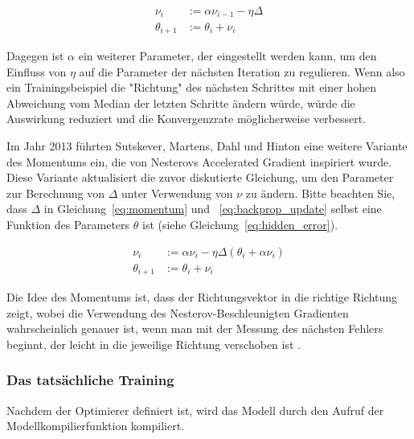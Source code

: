 \begin{equation}
    \begin{split}
        \nu_{i} &:= \alpha \nu_{i-1} - \eta \varDelta \\
        \theta_{i+1} &:= \theta_i + \nu_i
    \end{split}
    \label{eq:momentum}
\end{equation}

Dagegen ist $\alpha$ ein weiterer Parameter, der eingestellt werden kann, um den Einfluss von $\eta$ auf die Parameter der nächsten Iteration zu regulieren.
Wenn also ein Trainingsbeispiel die "Richtung" des nächsten Schrittes mit einer hohen Abweichung vom Median der letzten Schritte ändern würde, würde die Auswirkung reduziert und die Konvergenzrate möglicherweise verbessert.

Im Jahr 2013 führten Sutskever, Martens, Dahl und Hinton \cite{Sutskever2013} eine weitere Variante des Momentums ein, die von Nesterovs Accelerated Gradient \cite{Nesterov1983} inspiriert wurde.
Diese Variante aktualisiert die zuvor diskutierte Gleichung, um den Parameter zur Berechnung von $\varDelta$ unter Verwendung von $\nu$ zu ändern.
Bitte beachten Sie, dass $\varDelta$ in Gleichung~\eqref{eq:momentum} und ~\eqref{eq:backprop_update} selbst eine Funktion des Parameters $\theta$ ist (siehe Gleichung~\eqref{eq:hidden_error}).

\begin{equation}
    \begin{split}
    \nu_i & := \alpha \nu_i - \eta \varDelta(\theta_i + \alpha \nu_i) \\
    \theta_{i+1} & := \theta_i + \nu_i
    \end{split}
    \label{eq:nesterov}
\end{equation}

Die Idee des Momentums ist, dass der Richtungsvektor in die richtige Richtung zeigt, wobei die Verwendung des Nesterov-Beschleunigten Gradienten wahrscheinlich genauer ist, wenn man mit der Messung des nächsten Fehlers beginnt, der leicht in die jeweilige Richtung verschoben ist \cite[S.353]{Geron2019} \cite[S.291]{Goodfellow2017}.

\subsubsection{Das tatsächliche Training}

Nachdem der Optimierer definiert ist, wird das Modell durch den Aufruf der Modellkompilierfunktion kompiliert.

